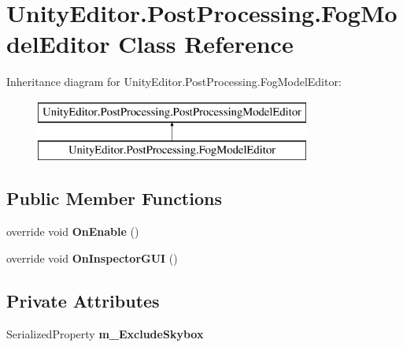 \hypertarget{class_unity_editor_1_1_post_processing_1_1_fog_model_editor}{}\section{Unity\+Editor.\+Post\+Processing.\+Fog\+Model\+Editor Class Reference}
\label{class_unity_editor_1_1_post_processing_1_1_fog_model_editor}
Inheritance diagram for Unity\+Editor.\+Post\+Processing.\+Fog\+Model\+Editor\+:\begin{figure}[H]
\begin{center}
\leavevmode
\includegraphics[height=2.000000cm]{class_unity_editor_1_1_post_processing_1_1_fog_model_editor}
\end{center}
\end{figure}
\subsection*{Public Member Functions}
\begin{DoxyCompactItemize}
\item 
\mbox{\label{class_unity_editor_1_1_post_processing_1_1_fog_model_editor_af4c50497dc8b6d6fa9a1f117be43c18b}} 
override void {\bfseries On\+Enable} ()
\item 
\mbox{\label{class_unity_editor_1_1_post_processing_1_1_fog_model_editor_a31db175fb963bd4313e4d49a73d39f47}} 
override void {\bfseries On\+Inspector\+G\+UI} ()
\end{DoxyCompactItemize}
\subsection*{Private Attributes}
\begin{DoxyCompactItemize}
\item 
\mbox{\label{class_unity_editor_1_1_post_processing_1_1_fog_model_editor_ad0d89809d12155a6ec4647631e31ea2f}} 
Serialized\+Property {\bfseries m\+\_\+\+Exclude\+Skybox}
\end{DoxyCompactItemize}
